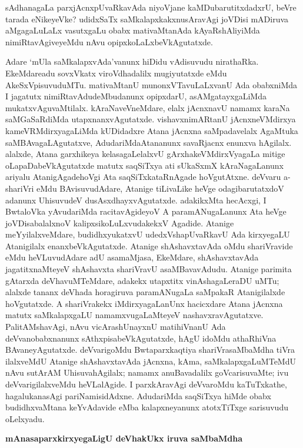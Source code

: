 sAdhanagaLa parxjAcnxpUvaRkavAda niyoVjane kaMDubarutitxdadxrU, beVre tarada eNikeyeVke? udidxSaTx saMkalapxkakxnusAravAgi joVDisi mADiruva aMgagaLuLaLx vasutxgaLu obabx mativaMtanAda kAyaRshAliyiMda nimiRtavAgiveyeMdu nAvu opipxkoLaLxbeVkAgutatxde.

Adare `mUla saMkalapxvAda'vanunx hiDidu vAdisuvudu nirathaRka. EkeMdare\break adu sovxVkatx viroVdhadalilx mugiyutatxde eMdu AkeSxVpisuvuduMTu. mativaMtanU munonxVTavuLaLxvanU Ada obabxniMda I jagatutx nimiRtavAdudeMbudanunx opipxdarU, asAMgatayxgaLiMda mukatxvAguvaMtilalx. kAraNaveVneMdare, elalx jAcnxnavU namamx karaNa saMGaSaRdiMda utapxnanxvAgutatxde. vishavxnimARtanU jAcnxneVMdirxya kameVRMdirxya\break\-gaLiMda kUDidadxre Atana jAcnxna saMpadavelalx AgaMtuka saMBAvagaLAgutatxve, AdudariMda\break Atananunx savaRjacnx enunxva hAgilalx. alalxde, Atana garxhikeya kelasagaLelalxvU gArxha\break\-keVMdirxVyagaLa mitige oLapaDabeVkAgutatxde matutx saqSiTxya ati sUkaSxmX kAraNagaLanunx ariyalu AtanigAgadehoVgi Ata saqSiTxkataRnAgade hoVgutAtxne. deVvaru a-shariVri eMdu BAvisuvudAdare, Atanige tiLivaLike heVge odagibarutatxdoV adanunx Uhisu\-vudeV dusAsxdhayxvAgutatxde. adakikxMta hecAcxgi, I BwtaloVka yAvudariMda racita\-vAgideyoV A paramANugaLanunx Ata heVge joVDisabalalxnoV kalipxsikoLuLxvudakekxV Agadide. Atanige meYyilalxveMdare, budidhxyukatxvU udedxVshapUvaRkavU Ada kirxye\-gaLU Atani\-gilalx enanxbeVkAgutatxde. Atanige shAshavxtavAda oMdu shariVravide eMdu heVLuvudAdare adU asamaMjasa, EkeMdare, shAshavxtavAda jagatitxnaMteyeV shAshavxta shariVravU asaMBavavAdudu. Atanige parimita gAtarxda deVhavuMTeMdare, adakekx utapxtitx vinAsha\-gaLeraDU uMTu; alalxde tananx deVhada horagiruva paramANugaLa saMpakaR Ata\-nigilalxde hoVgutatxde. A shariVrakekx iMdirxyagaLanUnx hacicxdare Atana jAcnxna matutx saMkalapx\-gaLU namamxvugaLaMteyeV nashavxravAgutatxve. PalitAMshavAgi, nAvu vicArashUnayxnU matihiVnanU Ada deVvanobabxnanunx sAthxpisabeVkAgutatxde, hAgU idoMdu athaRhiVna BAvaneyAgutatxde. deVvarigoMdu Bwtaparxkaqtiya shariVrasaMbaMdha tiVra ilalxveMdU Atanige shAshavxtavAda jAcnxna, kAma, saMkalapxgaLuMTeMdU nAvu sutArAM UhisuvahAgilalx; namamx anuBavadalilx goVcarisuvaMte; ivu deVvarigilalxveMdu heVLalAgide. I parxkAravAgi deVvaroMdu kaTuTxkathe, hagalukanasAgi pariNamisidAdxne. AdudariMda saqSiTxya hiMde obabx budidhxvaMtana keYvAdavide eMba kalapxneyanunx atotxTiTxge sarisuvudu oLelxyadu.

\smallskip
\begin{center}
{\Large\bf mAnasaparxkirxyegaLigU deVhakUkx iruva saMbaMdha}
\end{center}

